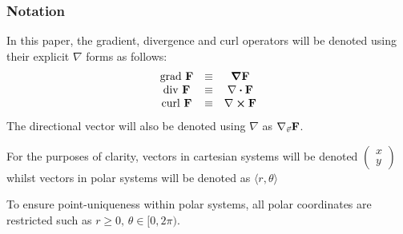 \subsubsection{Notation}
In this paper, the gradient, divergence and curl operators will be denoted using their explicit $\nabla$ forms as follows:
$$\begin{matrix}
	\mathrm{grad}\ \fatf&\equiv&\grad{\fatf}\\
	\mathrm{div}\ \fatf&\equiv&\divergence\fatf\\
	\mathrm{curl}\ \fatf&\equiv&\curl\fatf
\end{matrix}$$
The directional vector will also be denoted using $\nabla$ as $\nabla_{\vec{v}}\mathbf{F}$.

For the purposes of clarity, vectors in cartesian systems will be denoted $\begin{pmatrix}x\\y\end{pmatrix}$ whilst vectors in polar systems will be denoted as $\langle r,\theta\rangle$

To ensure point-uniqueness within polar systems, all polar coordinates are restricted such as $r\geq0,\,\theta\in[0,2\pi)$.